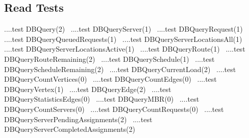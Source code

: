 \documentclass{article}
\begin{document}
\subsection{Read Tests}
\label{sec:read-tests}
\nwenddocs{}\endmoddef{}
\LA{}....test \code{}DBQuery\edoc{}(2)~{\nwtagstyle{}}\RA{}
\LA{}....test \code{}DBQueryServer\edoc{}(1)~{\nwtagstyle{}}\RA{}
\LA{}....test \code{}DBQueryRequest\edoc{}(1)~{\nwtagstyle{}}\RA{}
\LA{}....test \code{}DBQueryQueuedRequests\edoc{}(1)~{\nwtagstyle{}}\RA{}
\LA{}....test \code{}DBQueryServerLocationsAll\edoc{}(1)~{\nwtagstyle{}}\RA{}
\LA{}....test \code{}DBQueryServerLocationsActive\edoc{}(1)~{\nwtagstyle{}}\RA{}
\LA{}....test \code{}DBQueryRoute\edoc{}(1)~{\nwtagstyle{}}\RA{}
\LA{}....test \code{}DBQueryRouteRemaining\edoc{}(2)~{\nwtagstyle{}}\RA{}
\LA{}....test \code{}DBQuerySchedule\edoc{}(1)~{\nwtagstyle{}}\RA{}
\LA{}....test \code{}DBQueryScheduleRemaining\edoc{}(2)~{\nwtagstyle{}}\RA{}
\LA{}....test \code{}DBQueryCurrentLoad\edoc{}(2)~{\nwtagstyle{}}\RA{}
\LA{}....test \code{}DBQueryCountVertices\edoc{}(0)~{\nwtagstyle{}}\RA{}
\LA{}....test \code{}DBQueryCountEdges\edoc{}(0)~{\nwtagstyle{}}\RA{}
\LA{}....test \code{}DBQueryVertex\edoc{}(1)~{\nwtagstyle{}}\RA{}
\LA{}....test \code{}DBQueryEdge\edoc{}(2)~{\nwtagstyle{}}\RA{}
\LA{}....test \code{}DBQueryStatisticsEdges\edoc{}(0)~{\nwtagstyle{}}\RA{}
\LA{}....test \code{}DBQueryMBR\edoc{}(0)~{\nwtagstyle{}}\RA{}
\LA{}....test \code{}DBQueryCountServers\edoc{}(0)~{\nwtagstyle{}}\RA{}
\LA{}....test \code{}DBQueryCountRequests\edoc{}(0)~{\nwtagstyle{}}\RA{}
\LA{}....test \code{}DBQueryServerPendingAssignments\edoc{}(2)~{\nwtagstyle{}}\RA{}
\LA{}....test \code{}DBQueryServerCompletedAssignments\edoc{}(2)~{\nwtagstyle{}}\RA{}
\end{document}
